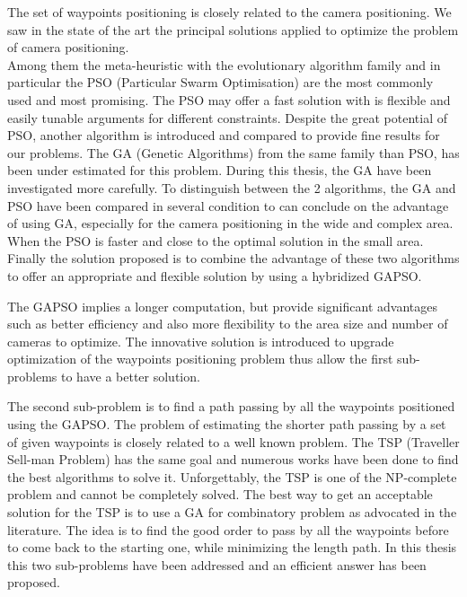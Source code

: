 The set of waypoints positioning is closely related to the camera positioning. We saw in the state of the art the principal solutions applied to optimize the problem of camera positioning.\\
Among them the meta-heuristic with the evolutionary algorithm family and in particular the PSO (Particular Swarm Optimisation) are the most commonly used and most promising.
 The PSO may offer a fast solution with is flexible and easily tunable arguments for different constraints. Despite the great potential of PSO, another algorithm is introduced and compared to provide fine results for our problems.
The GA (Genetic Algorithms) from the same family than PSO, has been under estimated for this problem. During this thesis, the GA have been investigated more carefully. 
To distinguish between the 2 algorithms, the GA and PSO have been compared in several condition to can conclude on the advantage of using GA, especially for the camera positioning in the wide and complex area. When the PSO is faster and close to the optimal solution in the small area.
Finally the solution proposed is to combine the advantage of these two algorithms to offer an appropriate and flexible solution by using a hybridized GAPSO. 

The GAPSO implies a longer computation, but provide significant advantages such as better efficiency and also more flexibility to the area size and number of  cameras to optimize.
The innovative solution is introduced to upgrade optimization of the waypoints positioning problem thus allow the first sub-problems to have a better solution.

The second sub-problem is to find a path passing by all the waypoints positioned using the GAPSO. The problem of estimating the shorter path passing by a set of given waypoints is closely related to a well known problem. The TSP (Traveller Sell-man Problem) has the same goal and numerous works have been done to find the best algorithms to solve it. Unforgettably, the TSP is one of the NP-complete problem and cannot be completely solved. The best way to get an acceptable solution for the TSP is to use a GA for combinatory problem as advocated in the literature. 
The idea is to find the good order to pass by all the waypoints before to come back to the starting one, while  minimizing the length path. 
In this thesis this two sub-problems have been addressed and an efficient answer has been proposed. 

